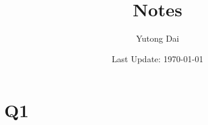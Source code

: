\documentclass[10pt]{article}
\title{Notes}
\author{Yutong Dai}
\date{Last Update: \today}
\begin{document}
\maketitle


\section{Q1}


% 
% 
\end{document}

